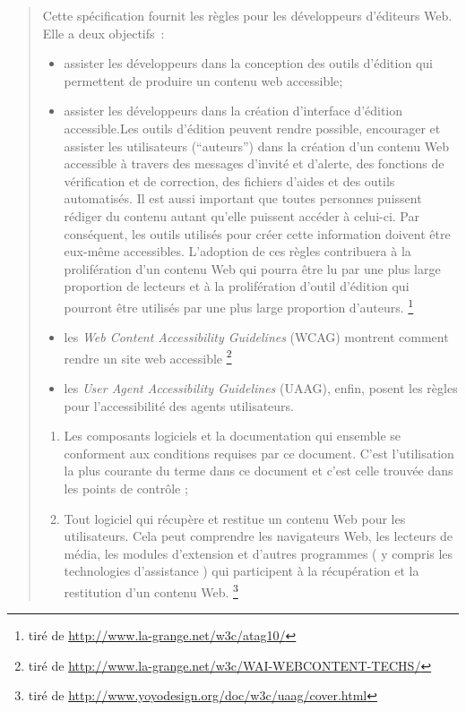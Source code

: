 \documentclass[
]{book}
\providecommand{\tightlist}{%
  \setlength{\itemsep}{0pt}\setlength{\parskip}{0pt}}
\begin{document}
\begin{quote}
Cette spécification fournit les règles pour les développeurs d'éditeurs
Web. Elle a deux objectifs~:

\begin{itemize}
\item
  assister les développeurs dans la conception
  des outils d'édition qui permettent de produire un contenu web
  accessible;
\item
  assister les développeurs dans la création
  d'interface d'édition accessible.Les outils d'édition peuvent rendre possible, encourager et
  assister les utilisateurs (``auteurs'') dans la création d'un contenu Web
  accessible à travers des messages d'invité et d'alerte, des fonctions
  de vérification et de correction, des fichiers d'aides et des outils
  automatisés. Il est aussi important que toutes personnes puissent
  rédiger du contenu autant qu'elle puissent accéder à celui-ci. Par
  conséquent, les outils utilisés pour créer cette information doivent
  être eux-même accessibles. L'adoption de ces règles contribuera à la
  prolifération d'un contenu Web qui pourra être lu par une plus large
  proportion de lecteurs et à la prolifération d'outil d'édition qui
  pourront être utilisés par une plus large proportion d'auteurs.
  \footnote{tiré de \url{http://www.la-grange.net/w3c/atag10/}}
\item
  les \emph{Web Content Accessibility Guidelines}
  (WCAG) montrent comment rendre un site web accessible \footnote{tiré de
    \url{http://www.la-grange.net/w3c/WAI-WEBCONTENT-TECHS/}}
\item
  les \emph{User Agent Accessibility Guidelines}
  (UAAG), enfin, posent les règles pour l'accessibilité des agents
  utilisateurs.
\end{itemize}

\begin{enumerate}
\def\labelenumi{\arabic{enumi}.}
\tightlist
\item
  Les composants logiciels et la documentation
  qui ensemble se conforment aux conditions requises par ce document.
  C'est l'utilisation la plus courante du terme dans ce document et c'est
  celle trouvée dans les points de contrôle ;
\item
  Tout logiciel qui récupère et restitue un
  contenu Web pour les utilisateurs. Cela peut comprendre les navigateurs
  Web, les lecteurs de média, les modules d'extension et d'autres
  programmes ( y compris les technologies d'assistance ) qui participent
  à la récupération et la restitution d'un contenu Web. \footnote{tiré de
    \url{http://www.yoyodesign.org/doc/w3c/uaag/cover.html}}
\end{enumerate}
\end{quote}
\end{document}

